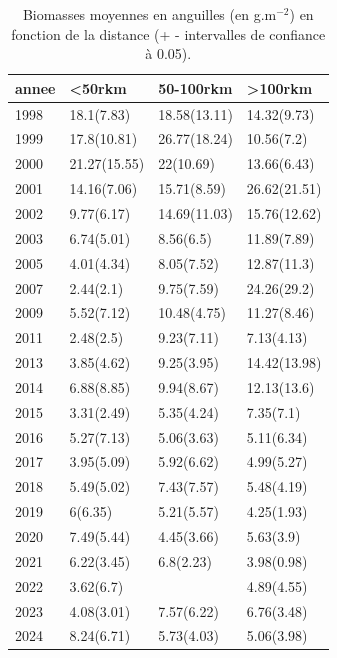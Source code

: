 \begin{table}[htbp]
\centering
\caption[Biomasse et distance.]{Biomasses moyennes en anguilles (en g.m$^{-2}$) en fonction de la distance (+ - intervalles de confiance à 0.05).} 
\label{table_biom_dist_annee}
\begin{tabular}{llll}
  \hline
annee & <50rkm & 50-100rkm & >100rkm \\ 
  \hline
1998 & 18.1(7.83) & 18.58(13.11) & 14.32(9.73) \\ 
  1999 & 17.8(10.81) & 26.77(18.24) & 10.56(7.2) \\ 
  2000 & 21.27(15.55) & 22(10.69) & 13.66(6.43) \\ 
  2001 & 14.16(7.06) & 15.71(8.59) & 26.62(21.51) \\ 
  2002 & 9.77(6.17) & 14.69(11.03) & 15.76(12.62) \\ 
  2003 & 6.74(5.01) & 8.56(6.5) & 11.89(7.89) \\ 
  2005 & 4.01(4.34) & 8.05(7.52) & 12.87(11.3) \\ 
  2007 & 2.44(2.1) & 9.75(7.59) & 24.26(29.2) \\ 
  2009 & 5.52(7.12) & 10.48(4.75) & 11.27(8.46) \\ 
  2011 & 2.48(2.5) & 9.23(7.11) & 7.13(4.13) \\ 
  2013 & 3.85(4.62) & 9.25(3.95) & 14.42(13.98) \\ 
  2014 & 6.88(8.85) & 9.94(8.67) & 12.13(13.6) \\ 
  2015 & 3.31(2.49) & 5.35(4.24) & 7.35(7.1) \\ 
  2016 & 5.27(7.13) & 5.06(3.63) & 5.11(6.34) \\ 
  2017 & 3.95(5.09) & 5.92(6.62) & 4.99(5.27) \\ 
  2018 & 5.49(5.02) & 7.43(7.57) & 5.48(4.19) \\ 
  2019 & 6(6.35) & 5.21(5.57) & 4.25(1.93) \\ 
  2020 & 7.49(5.44) & 4.45(3.66) & 5.63(3.9) \\ 
  2021 & 6.22(3.45) & 6.8(2.23) & 3.98(0.98) \\ 
  2022 & 3.62(6.7) &  & 4.89(4.55) \\ 
  2023 & 4.08(3.01) & 7.57(6.22) & 6.76(3.48) \\ 
  2024 & 8.24(6.71) & 5.73(4.03) & 5.06(3.98) \\ 
   \hline
\end{tabular}
\end{table}
